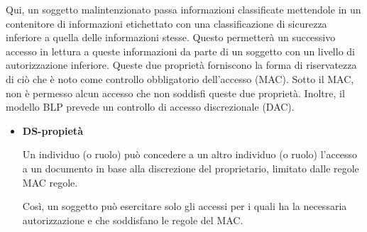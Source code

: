 Qui, un soggetto malintenzionato passa informazioni classificate mettendole in un contenitore di informazioni etichettato con una classificazione di sicurezza inferiore a quella delle informazioni stesse. Questo permetterà un successivo accesso in lettura a queste informazioni da parte di un soggetto con un livello di autorizzazione inferiore. Queste due proprietà forniscono la forma di riservatezza di ciò che è noto come controllo obbligatorio dell'accesso (MAC). Sotto il MAC, non è permesso alcun accesso che non soddisfi queste due proprietà. Inoltre, il modello BLP prevede un controllo di accesso discrezionale (DAC).
\begin{itemize}
    \item \textbf{DS-propietà}
    
    Un individuo (o ruolo) può concedere a un altro individuo (o ruolo) l'accesso a un documento in base alla discrezione del proprietario, limitato dalle regole MAC regole.


Così, un soggetto può esercitare solo gli accessi per i quali ha la necessaria autorizzazione e che soddisfano le regole del MAC.
\end{itemize}
